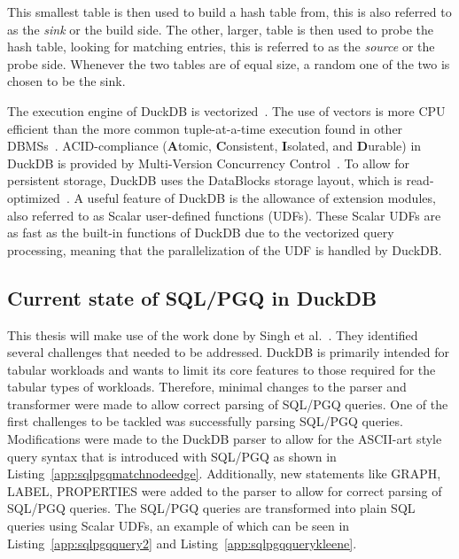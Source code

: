 This smallest table is then used to build a hash table from, this is also referred to as the \textit{sink} or the build side. 
The other, larger, table is then used to probe the hash table, looking for matching entries, this is referred to as the \textit{source} or the probe side.
Whenever the two tables are of equal size, a random one of the two is chosen to be the sink. 



The execution engine of DuckDB is vectorized~\cite{DBLP:conf/sigmod/RaasveldtM19}. The use of vectors is more CPU efficient than the more common tuple-at-a-time execution found in other DBMSs~\cite{DBLP:conf/cidr/BonczZN05}. 
ACID-compliance (\textbf{A}tomic, \textbf{C}onsistent, \textbf{I}solated, and \textbf{D}urable) in DuckDB is provided by Multi-Version Concurrency Control~\cite{DBLP:conf/sigmod/RaasveldtM19}.
To allow for persistent storage, DuckDB uses the DataBlocks storage layout, which is read-optimized~\cite{DBLP:conf/sigmod/RaasveldtM19}.
A useful feature of DuckDB is the allowance of extension modules, also referred to as Scalar user-defined functions (UDFs).
These Scalar UDFs are as fast as the built-in functions of DuckDB due to the vectorized query processing, meaning that the parallelization of the UDF is handled by DuckDB. 


\subsection{Current state of SQL/PGQ in DuckDB}\label{sec:sofar}
This thesis will make use of the work done by Singh et al.~\cite{sqlpgq-duckdb}. 
They identified several challenges that needed to be addressed. 
DuckDB is primarily intended for tabular workloads and wants to limit its core features to those required for the tabular types of workloads.
Therefore, minimal changes to the parser and transformer were made to allow correct parsing of SQL/PGQ queries.  
One of the first challenges to be tackled was successfully parsing SQL/PGQ queries. 
Modifications were made to the DuckDB parser to allow for the ASCII-art style query syntax that is introduced with SQL/PGQ as shown in Listing~\ref{app:sqlpgqmatchnodeedge}. 
Additionally, new statements like GRAPH, LABEL, PROPERTIES were added to the parser to allow for correct parsing of SQL/PGQ queries.
The SQL/PGQ queries are transformed into plain SQL queries using Scalar UDFs, an example of which can be seen in Listing~\ref{app:sqlpgqquery2} and Listing~\ref{app:sqlpgqquerykleene}. 

